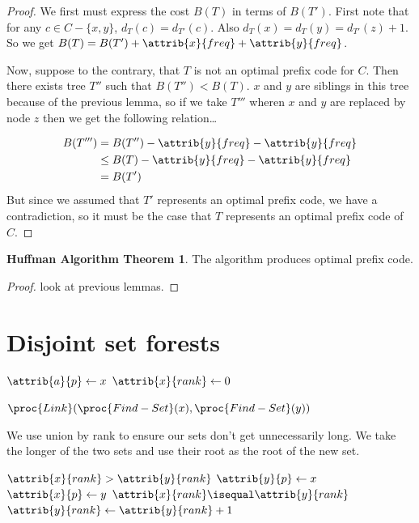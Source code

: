 \documentclass[11pt]{article}
\theoremstyle{definition}
\newtheorem*{huffman}{Huffman Algorithm Theorem}
\begin{document}
\begin{proof}
  We first must express the cost \(B(T)\) in terms of \(B(T')\).  First note that for any 
  \(c \in C - \{x,y\}\), \(d_T(c) = d_{T'}(c)\). Also \(d_T(x) = d_T(y) = d_{T'}(z)+1\). So we 
  get \(B(T) = B(T') + \attrib{x}{freq} + \attrib{y}{freq}\). 

  Now, suppose to the contrary, that \(T\) is not an optimal prefix code for \(C\).  Then there 
  exists tree \(T''\) such that \(B(T'') < B(T)\).  \(x\) and \(y\) are siblings in this tree 
  because of the previous lemma, so if we take \(T'''\) wheren \(x\) and \(y\) are replaced by 
  node \(z\) then we get the following relation\dots 

  \begin{align*}
    && B(T''') &= B(T'') - \attrib{y}{freq} - \attrib{y}{freq} && \\
    && &\leq B(T) - \attrib{y}{freq} - \attrib{y}{freq} && \\
    && &= B(T')
  \end{align*}
  But since we assumed that \(T'\) represents an optimal prefix code, we have a contradiction, so 
  it must be the case that \(T\) represents an optimal prefix code of \(C\).
\end{proof}

\begin{huffman}
  The  algorithm produces optimal prefix code.
\end{huffman}
\begin{proof}
  look at previous lemmas.
\end{proof}
\newpage 
\section*{Disjoint set forests}
\begin{codebox}
  \li \(\attrib{a}{p} \gets x\)
  \li \(\attrib{x}{rank} \gets 0\)
\end{codebox}

\begin{codebox}
  \li \(\proc{Link}(\proc{Find-Set}(x), \proc{Find-Set}(y))\)
\end{codebox}

We use union by rank to ensure our sets don't get unnecessarily long.  We take the longer of the 
two sets and use their root as the root of the new set.

\begin{codebox}
  \li \If \(\attrib{x}{rank} > \attrib{y}{rank}\) \Then 
    \li \(\attrib{y}{p} \gets x\)
  \li\Else \(\attrib{x}{p} \gets y\)
    \li \If \(\attrib{x}{rank} \isequal \attrib{y}{rank}\) \Then 
      \li \(\attrib{y}{rank} \gets \attrib{y}{rank} + 1\) \End \End
\end{codebox}
\end{document}
